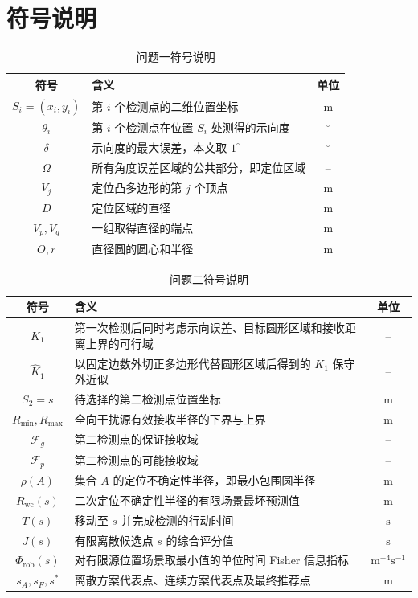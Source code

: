 \section{符号说明}

\begin{table}[H]
  \centering
  \caption{问题一符号说明}
  \label{tab:symbols}
  \begin{tabularx}{0.9\textwidth}{@{}cXc@{}}
    \toprule
    符号 & 含义 & 单位 \\
    \midrule
    $S_i=(x_i,y_i)$ & 第 $i$ 个检测点的二维位置坐标 & $\mathrm{m}$ \\
    $\theta_i$ & 第 $i$ 个检测点在位置 $S_i$ 处测得的示向度 & $^\circ$ \\
    $\delta$ & 示向度的最大误差，本文取 $1^\circ$ & $^\circ$ \\
    $\Omega$ & 所有角度误差区域的公共部分，即定位区域 & -- \\
    $V_j$ & 定位凸多边形的第 $j$ 个顶点 & m \\
    $D$ & 定位区域的直径 & m \\
    $V_p,V_q$ & 一组取得直径的端点 & m \\
    $O,r$ & 直径圆的圆心和半径 & m \\
    \bottomrule
  \end{tabularx}
\end{table}

\begin{table}[H]
  \centering
  \caption{问题二符号说明}
  \label{tab:q2-symbols}
  \begin{tabularx}{0.94\textwidth}{@{}cXc@{}}
    \toprule
    符号 & 含义 & 单位 \\
    \midrule
    $K_1$ & 第一次检测后同时考虑示向误差、目标圆形区域和接收距离上界的可行域 & -- \\
    $\widehat K_1$ & 以固定边数外切正多边形代替圆形区域后得到的 $K_1$ 保守外近似 & -- \\
    $S_2=s$ & 待选择的第二检测点位置坐标 & $\mathrm{m}$ \\
    $R_{\min},R_{\max}$ & 全向干扰源有效接收半径的下界与上界 & $\mathrm{m}$ \\
    $\mathcal F_g$ & 第二检测点的保证接收域 & -- \\
    $\mathcal F_p$ & 第二检测点的可能接收域 & -- \\
    $\rho(A)$ & 集合 $A$ 的定位不确定性半径，即最小包围圆半径 & $\mathrm{m}$ \\
    $R_{\mathrm{wc}}(s)$ & 二次定位不确定性半径的有限场景最坏预测值 & $\mathrm{m}$ \\
    $T(s)$ & 移动至 $s$ 并完成检测的行动时间 & $\mathrm{s}$ \\
    $J(s)$ & 有限离散候选点 $s$ 的综合评分值 & $\mathrm{s}$ \\
    $\Phi_{\mathrm{rob}}(s)$ & 对有限源位置场景取最小值的单位时间 Fisher 信息指标 & $\mathrm{m}^{-4}\mathrm{s}^{-1}$ \\
    $s_A,s_F,s^*$ & 离散方案代表点、连续方案代表点及最终推荐点 & $\mathrm{m}$ \\
    \bottomrule
  \end{tabularx}
\end{table}

